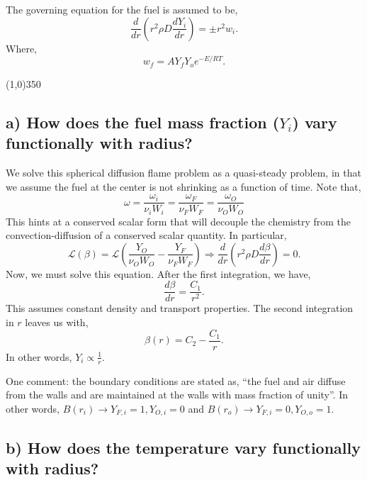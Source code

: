 \documentclass{article}
\begin{document}
The governing equation for the fuel is assumed to be, 
\begin{equation*}
 \frac{d}{dr}\left( r^2 \rho D \frac{dY_i}{dr}\right) = \pm r^2 w_i. 
\end{equation*}
Where, 
\begin{equation*}
 w_f = A Y_f Y_o e^{-E/RT}.
\end{equation*}
\begin{center}
\line(1,0){350}
\end{center}
\subsection*{a) How does the fuel mass fraction ($Y_i$) vary functionally
  with radius?}
We solve this spherical diffusion flame problem as a quasi-steady
problem, in that we assume the fuel at the center is not shrinking as a
function of time. Note that, 
\begin{equation*}
\omega = \frac{\omega_i}{\nu_i W_i}= \frac{\omega_F}{\nu_F W_F} =
 \frac{\omega_O}{\nu_O W_O} 
\end{equation*}
This hints at a conserved scalar form that will
decouple the chemistry from the convection-diffusion of a conserved
scalar quantity. In particular, 
\begin{equation*}
\mathcal{L}\left(\beta \right) = \mathcal{L}\left( \frac{Y_O}{\nu_O W_O}
	    - \frac{Y_F}{\nu_F W_F} \right) \Rightarrow \frac{d}{dr}\left( r^2
	    \rho D \frac{d \beta}{dr}\right) = 0 .
\end{equation*}
Now, we must solve this equation. After the first integration, we have, 
\begin{equation*}
\frac{d \beta}{dr} = \frac{C_1}{r^2 }.
\end{equation*}
This assumes constant density and transport properties. The second
integration in $r$ leaves us with, 
\begin{equation*}
 \beta(r) = C_2 - \frac{C_1}{ r }.
\end{equation*}
In other words, $Y_i \propto \frac{1}{r} $. 

One comment: the boundary conditions are stated as, ``the fuel and air
 diffuse from the walls and are maintained at the walls with mass
 fraction of unity''. In other words, $B(r_i) \rightarrow Y_{F,i} = 1, Y_{O,i} =
 0 $ and $B(r_o) \rightarrow Y_{F,i} = 0, Y_{O,o} = 1$. 

\subsection*{b) How does the temperature vary functionally with radius?}
\end{document}

